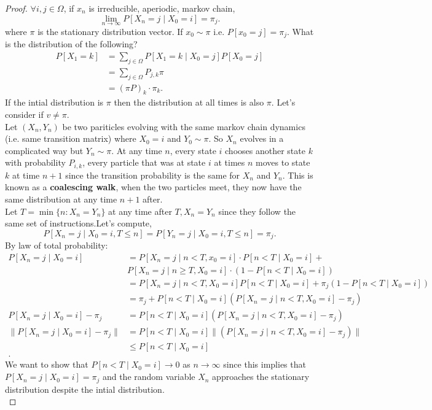 \documentclass[a4paper]{article}
\begin{document}
\begin{proof}
  $\forall i,j \in \Omega$, if  $x_n$ is irreducible, aperiodic, markov chain, 
   \[
     \lim_{n \to \infty} P[X_n = j \mid X_0 = i] = \pi_j
  .\] 
  where $\pi$ is the stationary distribution vector. If $x_0 \sim \pi$ i.e. $P[x_0 = j] = \pi_j$. What is the distribution of the following?
  \begin{align*}
    P[X_1=k] &= \sum_{j \in \Omega} P[X_1 = k \mid X_0 = j] P[X_0 = j] \\
    &= \sum_{j \in \Omega} P_{j,k} \pi \\
    &= \left( \pi P \right)_{k} \cdot \pi_k 
  .\end{align*}
  If the intial distribution is $\pi$ then the distribution at all times is also $\pi$. Let's consider if $v \neq \pi$. \\

  
  Let $(X_n, Y_n)$ be two pariticles evolving with the same markov chain dynamics (i.e. same transition matrix) where  $X_0 = i$ and $Y_0 \sim \pi$. So $X_n$ evolves in a complicated way but  $Y_n \sim \pi$. At any time $n$, every state  $i$ chooses another state  $k$ with probability  $P_{i,k}$, every particle that was at state $i$ at times  $n$ moves to state  $k$ at time  $n+1$ since the transition probability is the same for $X_n$ and  $Y_n$. This is known as a \textbf{coalescing walk}, when the two particles meet, they now have the same distribution at any time $n+1 $ after.\\


  Let  $T = \min \{n: X_n = Y_n\} $ at any time after $T, X_n = Y_n$ since they follow the same set of instructions.Let's compute,
   \[
     P[X_n = j \mid  X_0 = i, T \leq n] = P[Y_n = j \mid  X_0 = i, T \leq n] = \pi_j
  .\] 
  By law of total probability:
  \begin{align*}
    P[X_n = j \mid  X_0 = i] &= P[X_n = j \mid  n < T, x_0 = i] \cdot P[n < T \mid X_0 = i] + \\
                             &P[X_n = j \mid n \geq T, X_0 = i] \cdot (1-P[n < T \mid X_0 =i ])\\
                             &= P[X_n = j \mid  n < T, X_0 = i] P[n < T \mid  X_0 =i ] + \pi_j ( 1- P[n < T \mid  X_0 = i])\\
                             &= \pi_j + P[n < T \mid X_0 = i] (P[X_n = j \mid n < T, X_0 = i] -\pi_j) \\
    P[X_n = j \mid X_0 =i] - \pi_j &= P[n < T \mid X_0 = i] (P[X_n = j \mid n < T, X_0 = i] -\pi_j) \\
    \| P[X_n = j \mid X_0 = i] - \pi_j \|  &= P[n < T \mid X_0 = i] \| (P[X_n = j \mid n < T, X_0 = i] -\pi_j) \|  \\
                                               &\leq P[n < T \mid X_0=i] \\
   .\end{align*}
    We want to show that $P[n < T \mid X_0 = i] \to 0 $ as $n \to \infty$ since this implies that  $P[X_n = j \mid X_0=i] = \pi_j$ and the random variable $X_n$ approaches the stationary distribution despite the intial distribution. \\



\end{proof}
\end{document}
